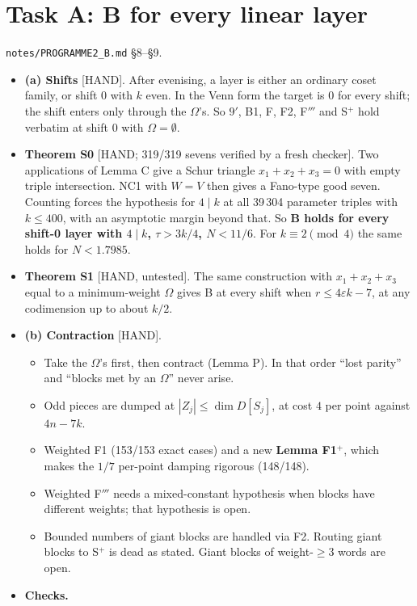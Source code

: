\documentclass[11pt]{article}
\newcommand{\lvl}[1]{\textsf{\small[#1]}}
\begin{document}
\section{Task A: B for every linear layer}
\texttt{notes/PROGRAMME2\_B.md} \S8--\S9.
\begin{itemize}
\item \textbf{(a) Shifts} \lvl{HAND}. After evenising, a layer is either an ordinary coset family, or shift $0$ with $k$ even.
In the Venn form the target is $0$ for every shift; the shift enters only through the $\Omega$'s. So $9'$, B1, F, F2, F$'''$
and S$^+$ hold verbatim at shift $0$ with $\Omega=\emptyset$.
\item \textbf{Theorem S0} \lvl{HAND; 319/319 sevens verified by a fresh checker}. Two applications of Lemma C give a Schur
triangle $x_1+x_2+x_3=0$ with empty triple intersection. NC1 with $W=V$ then gives a Fano-type good seven. Counting forces the
hypothesis for $4\mid k$ at all 39\,304 parameter triples with $k\le400$, with an asymptotic margin beyond that. So \textbf{B
holds for every shift-0 layer with $4\mid k$, $\tau>3k/4$, $N<11/6$}. For $k\equiv2\pmod4$ the same holds for $N<1.7985$.
\item \textbf{Theorem S1} \lvl{HAND, untested}. The same construction with $x_1+x_2+x_3$ equal to a minimum-weight $\Omega$
gives B at every shift when $r\le4\varepsilon k-7$, at any codimension up to about $k/2$.
\item \textbf{(b) Contraction} \lvl{HAND}.
  \begin{itemize}
  \item Take the $\Omega$'s first, then contract (Lemma P). In that order ``lost parity'' and ``blocks met by an $\Omega$''
  never arise.
  \item Odd pieces are dumped at $|Z_j|\le\dim D[S_j]$, at cost $4$ per point against $4n-7k$.
  \item Weighted F1 (153/153 exact cases) and a new \textbf{Lemma F1$^+$}, which makes the $1/7$ per-point damping
  rigorous (148/148).
  \item Weighted F$'''$ needs a mixed-constant hypothesis when blocks have different weights; that hypothesis is open.
  \item Bounded numbers of giant blocks are handled via F2. Routing giant blocks to S$^+$ is dead as stated. Giant blocks of
  weight-$\ge3$ words are open.
  \end{itemize}
\item \textbf{Checks.}
  \begin{itemize}

\end{itemize}
\end{itemize}
\end{document}
